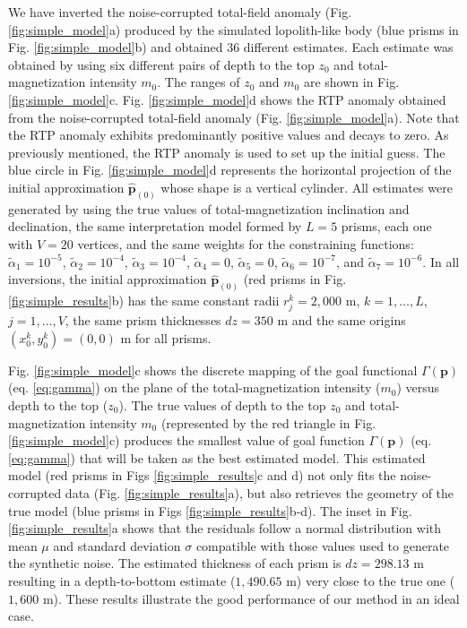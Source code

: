 We have inverted the noise-corrupted total-field anomaly (Fig. \ref{fig:simple_model}a) produced by the simulated lopolith-like body (blue prisms in Fig. \ref{fig:simple_model}b) and obtained 36 different estimates. 
Each estimate was obtained by using six different pairs of depth to the top $ z_0 $ and total-magnetization intensity $ m_0 $.
The ranges of $ z_0 $ and $ m_0 $ are shown in Fig. \ref{fig:simple_model}c. 
Fig. \ref{fig:simple_model}d shows the RTP anomaly obtained from the noise-corrupted 
total-field anomaly (Fig. \ref{fig:simple_model}a).
Note that the RTP anomaly exhibits predominantly positive values and decays to zero.
As previously mentioned, the RTP anomaly is used to set up the initial guess. 
The blue circle in Fig. \ref{fig:simple_model}d represents the horizontal projection 
of the initial approximation $\hat{\mathbf{p}}_{(0)}$ whose shape is a vertical cylinder.
All estimates were generated by using the true values of total-magnetization inclination and declination, the same interpretation model formed by $ L = 5 $ prisms, 
each one with $ V = 20 $ vertices, and the same weights for the constraining functions: 
$\tilde{\alpha}_1 = 10^{-5}$, 
$\tilde{\alpha}_2 = 10^{-4}$, 
$\tilde{\alpha}_3 = 10^{-4}$, 
$\tilde{\alpha}_4 = 0$, 
$\tilde{\alpha}_5 = 0$, 
$\tilde{\alpha}_6 = 10^{-7}$, and 
$\tilde{\alpha}_7 = 10^{-6}$. 
In all inversions, the initial approximation $\hat{\mathbf{p}}_{(0)}$ (red prisms in Fig. \ref{fig:simple_results}b) has the same constant radii $ r^k_j = 2,000 $ m, 
$ k = 1, \dots, L $, $ j  = 1, \dots, V $, the same prism thicknesses $ dz = 350 $ m and the same origins $(x^k_0, y^k_0) = (0, 0) $ m for all prisms.

Fig. \ref{fig:simple_model}c shows the discrete mapping of the goal functional 
$ \Gamma(\mathbf{p}) $ (eq. \ref{eq:gamma}) on the plane of the total-magnetization intensity ($ m_0 $) versus depth to the top ($ z_0 $). 
The true values of depth to the top $ z_0 $ and total-magnetization intensity $ m_0 $ (represented by the red triangle in Fig. \ref{fig:simple_model}c) produces 
the smallest value of goal function  $ \Gamma(\mathbf{p}) $ (eq. \ref{eq:gamma})
that will be taken as the best estimated model.
This estimated model (red prisms in Figs \ref{fig:simple_results}c and d) 
not only fits the noise-corrupted data (Fig. \ref{fig:simple_results}a), 
but also retrieves the geometry of the true model (blue prisms in Figs \ref{fig:simple_results}b-d). 
The inset in Fig. \ref{fig:simple_results}a shows that the residuals follow a normal distribution with mean $ \mu $ and standard deviation $ \sigma $ compatible with those values used to generate the synthetic noise. 
The estimated thickness of each prism is $ dz = 298.13 $ m resulting in a depth-to-bottom estimate ($ 1,490.65$ m) very close to the true one ($ 1,600 $ m). 
These results illustrate the good performance of our method in an ideal case.

